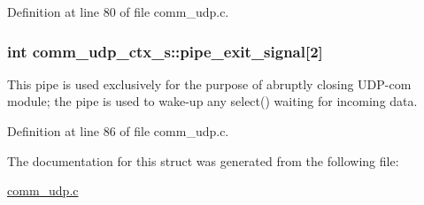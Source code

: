 Definition at line 80 of file comm\+\_\+udp.\+c.

\subsubsection[{\texorpdfstring{pipe\+\_\+exit\+\_\+signal}{pipe_exit_signal}}]{\setlength{\rightskip}{0pt plus 5cm}int comm\+\_\+udp\+\_\+ctx\+\_\+s\+::pipe\+\_\+exit\+\_\+signal\mbox{[}2\mbox{]}}\hypertarget{structcomm__udp__ctx__s_af98857f20d566dca629dbe52a7f8e57c}{}\label{structcomm__udp__ctx__s_af98857f20d566dca629dbe52a7f8e57c}
This pipe is used exclusively for the purpose of abruptly closing U\+D\+P-\/com module; the pipe is used to wake-\/up any \textquotesingle{}select()\textquotesingle{} waiting for incoming data. 

Definition at line 86 of file comm\+\_\+udp.\+c.



The documentation for this struct was generated from the following file\+:\begin{DoxyCompactItemize}
\item 
\hyperlink{comm__udp_8c}{comm\+\_\+udp.\+c}\end{DoxyCompactItemize}
